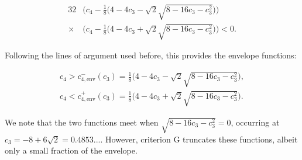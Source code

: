\begin{align}
32 &\Big( c_4 - \frac{1}{8}\big( 4 - 4c_3 - \sqrt{2}\sqrt{8-16c_3-c_3^2} \big) \Big) \nonumber\\
\times&\Big( c_4 - \frac{1}{8}\big( 4 - 4c_3 + \sqrt{2}\sqrt{8-16c_3-c_3^2} \big) \Big) < 0.
\end{align}

Following the lines of argument used before, this provides the envelope 
functions:

\begin{align}
c_4 > c_{4,\mathrm{env}}^{-}(c_3) = \frac{1}{8}\big( 4 - 4c_3 - \sqrt{2}\sqrt{8-16c_3-c_3^2} \big), \\
c_4 < c_{4,\mathrm{env}}^{+}(c_3) = \frac{1}{8}\big( 4 - 4c_3 + \sqrt{2}\sqrt{8-16c_3-c_3^2} \big).
\end{align}

We note that the two functions meet when $\sqrt{8-16c_3-c_3^2}=0$, occurring
at $c_3 = -8 + 6 \sqrt{2} = 0.4853...$. However, criterion G truncates these
functions, albeit only a small fraction of the envelope.

